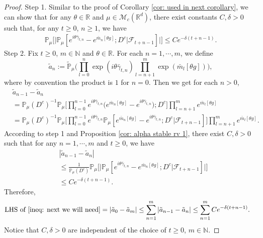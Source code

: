\documentclass[12pt,a4paper]{amsart}
\theoremstyle{plain}
\theoremstyle{definition}
\numberwithin{equation}{section}
\begin{document}
\begin{proof}
Step 1. Similar to the proof of Corollary \ref{cor: used in next corollary}, we can show that  for any  $\theta\in \mathbb{R}$ and $\mu\in \mathcal{M}_c(\mathbb{R}^d)$, there exist constants $C,\delta>0$ such that, for any $t\geq 0$, $n\geq 1$, we have
\begin{align}
    \mathbb{P}_{\mu}\Big[\big|\mathbb{P}_{\mu}[e^{i\theta\bar{\gamma}_{t,n}}-e^{\bar{m}_n[\theta g]}; D^c | \mathscr F_{t+n-1}]\big|\Big]\leq Ce^{-\delta(t+n-1)}.
\end{align}
Step 2.   Fix $t\geq 0$, $m\in \mathbb{N}$ and $\theta\in \mathbb{R}$.
    For each $n=1,\cdots,m$, we define
    \[\tilde{a}_n:=\mathbb{\tilde{P}}_{\mu}\Big(\prod_{l=0}^{n}\exp\left(i\theta\bar{\gamma}_{t,n}\right)\prod_{l=n+1}^{m}\exp(\bar{m}_l[\theta g])\Big),\]
     where by convention the product is $1$ for $n=0$. Then we get for each $n > 0$,
    \begin{align*}
        &\tilde{a}_{n-1} - \tilde{a}_n
        \\&=\mathbb{P}_{\mu}(D^c)^{-1}\mathbb{P}_{\mu}\Big[\prod_{l=0}^{n-1}e^{i\theta\bar{\gamma}_{t,n}}\Big(e^{\bar{m}_n[\theta g]}-e^{i\theta \bar{\gamma}_{t,n}}\Big);D^c\Big]\prod_{l=n+1}^{m}e^{\bar{m}_l[\theta g]}
        \\&=\mathbb{P}_{\mu}(D^c)^{-1}\mathbb{P}_{\mu}\Big[\prod_{l=0}^{n-1}e^{i\theta\bar{\gamma}_{t,n}}\mathbb{P}_{\mu}[e^{\bar{m}_n[\theta g]}-e^{i\theta \bar{\gamma}_{t,n}};D^c|\mathscr{F}_{t+n-1}]\Big]\prod_{l=n+1}^{m}e^{\bar{m}_l[\theta g]}.
    \end{align*}
   According to step 1 and Proposition \ref{cor: alpha stable rv 1},
    there exist $C,\delta>0$ such that for any $n=1,\cdots, m$ and $t\geq0$, we have
    \begin{align*}
        &|\tilde{a}_{n-1}- \tilde{a}_n|
        \\&\leq \frac{1}{\mathbb{P}_{\mu}(D^c)}\mathbb{P}_{\mu}\Big[\big|\mathbb P_\mu[e^{i\theta\bar{\gamma}_{t,n}}-e^{\bar{m}_n[\theta g]}; D^c\big|\mathscr{F}_{t+n-1}]\big|\Big]
        \\& \leq C e^{-\delta(t+n-1)}.
    \end{align*}
Therefore,
\begin{align}
    \text{LHS of \eqref{ineq: next we will need}}&= \left|\tilde{a}_{0}-\tilde{a}_m\right|
    \leq\sum_{n=1}^m\left|\tilde{a}_{n-1}-\tilde{a}_n\right|
    \leq \sum_{n=1}^m C e^{-\delta(t+n-1)}.
\end{align}
	Notice that $C, \delta>0$ are independent of the choice of $t\geq 0$, $m\in \mathbb{N}$.
\end{proof}
\end{document}
